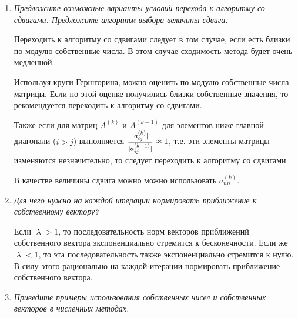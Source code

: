 \documentclass[12pt, a4paper]{article}
\begin{document}
\begin{enumerate}
		\smallskip
		
		\item \textit{Предложите возможные варианты условий перехода к алгоритму со сдвигами. Предложите алгоритм выбора величины сдвига.}
		
		Переходить к алгоритму со сдвигами следует в том случае, если есть близки по модулю собственные числа. В этом случае сходимость метода будет очень медленной.
		
		Используя круги Гершгорина, можно оценить по модулю собственные числа матрицы. Если по этой оценке получились близки собственные значения, то рекомендуется переходить к алгоритму со сдвигами.
		
		Также если для матриц $A^{(k)}$ и $A^{(k-1)}$ для элементов ниже главной диагонали ($i > j$) выполняется $\hbox{\footnotesize$\displaystyle\frac{|a_{ij}^{(k)}|}{|a_{ij}^{(k-1)}|}$} \approx 1$, т.е. эти элементы матрицы изменяются незначительно, то следует переходить к алгоритму со сдвигами.
		
		В качестве величины сдвига можно можно использовать $a_{nn}^{(k)}$.
		
		\smallskip
		
		\item \textit{Для чего нужно на каждой итерации нормировать приближение к собственному вектору?}
		
		Если $|\lambda| > 1$, то последовательность норм векторов приближений собственного вектора экспоненциально стремится к бесконечности. Если же $|\lambda| < 1$, то эта последовательность также экспоненциально стремится к нулю. В силу этого рационально на каждой итерации нормировать приближение собственного вектора.
		\smallskip
		
		
		\item \textit{Приведите примеры использования собственных чисел	и собственных векторов в численных методах.}
		

\end{enumerate}
\end{document}
